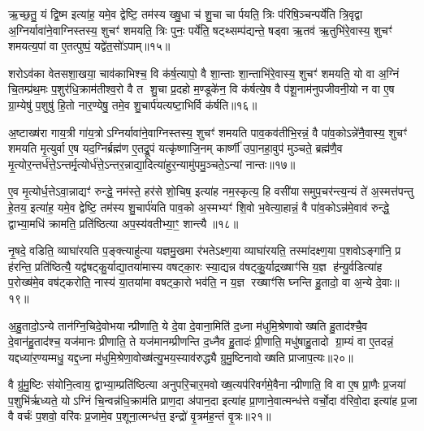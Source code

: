 ऋ॒च्छ॒तु॒ यं द्वि॒ष्म इत्या॑ह॒ यमे॒व द्वेष्टि॒ तम॑स्य ख्षु॒धा च॑ शु॒चा चार्पयति॒ त्रिः प॑रिषि॒ञ्चन्पर्ये॑ति त्रि॒वृद्वा अ॒ग्निर्यावा॑ने॒वाग्निस्तस्य॒ शुचꣳ॑ शमयति॒ त्रिः पुनः॒ पर्ये॑ति॒ षट्थ्सम्प॑द्यन्ते॒ षड्वा ऋ॒तव॑ ऋ॒तुभि॑रे॒वास्य॒ शुचꣳ॑ शमयत्य॒पां वा ए॒तत्पुष्पं॒ यद्वे॑त॒सो॑ऽपाम्॥१५॥

शरोऽव॑का वेतसशा॒खया॒ चाव॑काभिश्च॒ वि क॑र्\mbox{}ष॒त्यापो॒ वै शा॒न्ताः शा॒न्ताभि॑रे॒वास्य॒ शुचꣳ॑ शमयति॒ यो वा अ॒ग्निं चि॒तम्प्र॑थ॒मः प॒शुर॑धि॒क्राम॑तीश्व॒रो वै त शु॒चा प्र॒दहो म॒ण्डूके॑न॒ वि क॑र्\mbox{}षत्ये॒ष वै प॑शू॒नाम॑नुपजीवनी॒यो न वा ए॒ष ग्रा॒म्येषु॑ प॒शुषु॑ हि॒तो नार॒ण्येषु॒ तमे॒व शु॒चार्प॑यत्यष्टा॒भिर्वि क॑र्\mbox{}षति॥१६॥

अ॒ष्टाख्ष॑रा गाय॒त्री गा॑य॒त्रोऽग्निर्यावा॑ने॒वाग्निस्तस्य॒ शुचꣳ॑ शमयति पाव॒कव॑तीभि॒रन्नं॒ वै पा॑व॒कोऽन्ने॑नै॒वास्य॒ शुचꣳ॑ शमयति मृ॒त्युर्वा ए॒ष यद॒ग्निर्ब्रह्म॑ण ए॒तद्रू॒पं यत्कृ॑ष्णाजि॒नम् कार्\mbox{}ष्णी॑ उपा॒नहा॒वुप॑ मुञ्चते॒ ब्रह्म॑णै॒व मृ॒त्योर॒न्तर्ध॑त्ते॒ऽन्तर्मृ॒त्योर्ध॑त्ते॒ऽन्तर॒न्नाद्या॒दित्या॑हुर॒न्यामु॑पमु॒ञ्चते॒ऽन्यां नान्तः॥१७॥

ए॒व मृ॒त्योर्ध॒त्तेऽवा॒न्नाद्यꣳ॑ रुन्द्धे॒ नम॑स्ते॒ हर॑से शो॒चिष॒ इत्या॑ह नम॒स्कृत्य॒ हि वसी॑यासमुप॒चर॑न्त्य॒न्यं ते॑ अ॒स्मत्त॑पन्तु हे॒तय॒ इत्या॑ह॒ यमे॒व द्वेष्टि॒ तम॑स्य शु॒चार्प॑यति पाव॒को अ॒स्मभ्यꣳ॑ शि॒वो भ॒वेत्या॒हान्नं॒ वै पा॑व॒कोऽन्न॑मे॒वाव॑ रुन्द्धे॒ द्वाभ्या॒मधि॑ क्रामति॒ प्रति॑ष्ठित्या अप॒स्य॑वतीभ्या॒ꣳ॒ शान्त्यै॥१८॥

{\anuvakamend[{शुग्वे॑त॒सो॑ऽपाम॑ष्टा॒भिर्विक॑र्\mbox{}षति॒ नान्तरेका॒न्नप॑ञ्चा॒शच्च॑॥४॥}]}

नृ॒षदे॒ वडिति॒ व्याघा॑रयति प॒ङ्क्त्याहु॑त्या यज्ञमु॒खमा र॑भतेऽक्ष्ण॒या व्याघा॑रयति॒ तस्मा॑दक्ष्ण॒या प॒शवोऽङ्गा॑नि॒ प्र ह॑रन्ति॒ प्रति॑ष्ठित्यै॒ यद्व॑षट्कु॒र्याद्या॒तया॑मास्य वषट्का॒रः स्या॒द्यन्न व॑षट्कु॒॒र्याद्रख्षाꣳ॑सि य॒ज्ञ ह॑न्यु॒र्वडित्या॑ह प॒रोख्ष॑मे॒व वष॑ट्करोति॒ नास्य॑ या॒तया॑मा वषट्का॒रो भव॑ति॒ न य॒ज्ञ रख्षाꣳ॑सि घ्नन्ति हु॒तादो॒ वा अ॒न्ये दे॒वाः॥१९॥

अ॒हु॒तादो॒ऽन्ये तान॑ग्नि॒चिदे॒वोभयान्प्रीणाति॒ ये दे॒वा दे॒वाना॒मिति॑ द॒ध्ना म॑धुमि॒श्रेणावोख्षति हु॒ताद॑श्चै॒व दे॒वान॑हु॒ताद॑श्च॒ यज॑मानः प्रीणाति॒ ते यज॑मानम्प्रीणन्ति द॒ध्नैव हु॒तादः॑ प्री॒णाति॒ मधु॑षाहु॒तादो ग्रा॒म्यं वा ए॒तदन्नं॒ यद्दध्या॑र॒ण्यम्मधु॒ यद्द॒ध्ना म॑धुमि॒श्रेणा॒वोख्ष॑त्यु॒भय॒स्याव॑रुद्ध्यै ग्रुमु॒ष्टिनावोख्षति प्राजाप॒त्यः॥२०॥

वै ग्रु॑मु॒ष्टिः स॑योनि॒त्वाय॒ द्वाभ्या॒म्प्रति॑ष्ठित्या अनुपरि॒चार॒मवोख्ष॒त्यप॑रिवर्गमे॒वैनान्प्रीणाति॒ वि वा ए॒ष प्रा॒णैः प्र॒जया॑ प॒शुभि॑र्\mbox{}ऋध्यते॒ योऽग्निं चि॒न्वन्न॑धि॒क्राम॑ति प्राण॒दा अ॑पान॒दा इत्या॑ह प्रा॒णाने॒वात्मन्ध॑त्ते वर्चो॒दा व॑रिवो॒दा इत्या॑ह प्र॒जा वै वर्चः॑ प॒शवो॒ वरि॑वः प्र॒जामे॒व प॒शूना॒त्मन्ध॑त्त॒ इन्द्रो॑ वृ॒त्रम॑ह॒न्तं वृ॒त्रः॥२१॥

